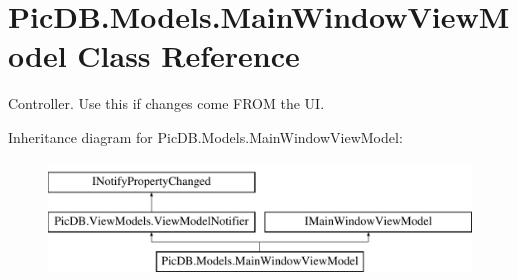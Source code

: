\hypertarget{class_pic_d_b_1_1_models_1_1_main_window_view_model}{}\section{Pic\+D\+B.\+Models.\+Main\+Window\+View\+Model Class Reference}
\label{class_pic_d_b_1_1_models_1_1_main_window_view_model}


Controller. Use this if changes come F\+R\+OM the UI.  


Inheritance diagram for Pic\+D\+B.\+Models.\+Main\+Window\+View\+Model\+:\begin{figure}[H]
\begin{center}
\leavevmode
\includegraphics[height=3.000000cm]{class_pic_d_b_1_1_models_1_1_main_window_view_model}
\end{center}
\end{figure}
